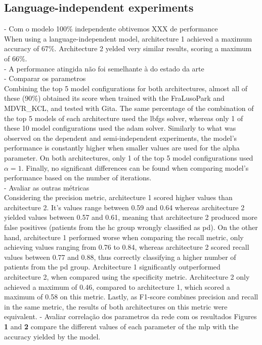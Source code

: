 \subsection{Language-independent experiments}
 - Com o modelo 100\% independente obtivemos XXX de performance \\
When using a language-independent model, architecture 1 achieved a maximum accuracy of 67\%. Architecture 2 yelded very similar results, scoring a maximum of 66\%. \\
 - A performance atingida não foi semelhante à do estado da arte \\
 - Comparar os parametros \\
 Combining the top 5 model configurations for both architectures, almost all of these (90\%) obtained its score when trained with the FraLusoPark and MDVR\_KCL, and tested with Gita. The same percentage of the combination of the top 5 models of each architecture used the lbfgs solver, whereas only 1 of these 10 model configurations used the adam solver. Similarly to what was observed on the dependent and semi-independent experiments, the model's performance is constantly higher when smaller values are used for the alpha parameter. On both architectures, only 1 of the top 5 model configurations used $\alpha = 1$. Finally, no significant differences can be found when comparing model's performance based on the number of iterations. \\
 - Avaliar as outras métricas \\
Considering the precision metric, architecture 1 scored higher values than architecture 2. It's values range between 0.59 and 0.64 whereas architecture 2 yielded values between 0.57 and 0.61, meaning that architecture 2 produced more false positives (patients from the \gls{hc} group wrongly classified as \gls{pd}). On the other hand, architecture 1 performed worse when comparing the recall metric, only achieving values ranging from 0.76 to 0.84, whereas architecture 2 scored recall values between 0.77 and 0.88, thus correctly classifying a higher number of patients from the \gls{pd} group. Architecture 1 significantly outperformed architecture 2, when compared using the specificity metric. Architecture 2 only achieved a maximum of 0.46, compared to architecture 1, which scored a maximum of 0.58 on this metric. Lastly, as F1-score combines precision and recall in the same metric, the results of both architectures on this metric were equivalent.
- Avaliar correlação dos parametros da rede com os resultados
Figures \textbf{1} and \textbf{2} compare the different values of each parameter of the \gls{mlp} with the accuracy yielded by the model.

